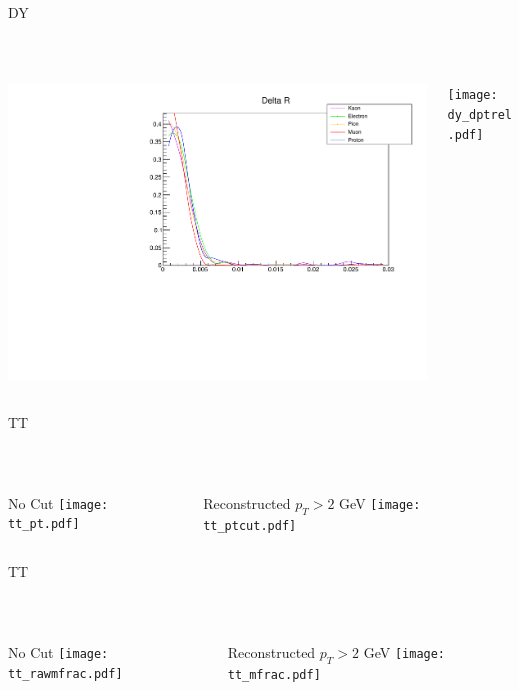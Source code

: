 \documentclass[10pt,handout]{beamer}
\begin{document}
\begin{frame}{ DY } 

\quad \quad \\
\begin{columns}
\begin{column}{0.5\textwidth}

\includegraphics[scale=.3]{dy_dr.pdf}

\end{column}
\begin{column}{0.5\textwidth}

\texttt{[image: dy\_dptrel.pdf]}
\end{column}
\end{columns}
\end{frame}

\begin{frame}{ TT } 

\quad \quad \\
\begin{columns}
\begin{column}{0.5\textwidth}
No Cut
\texttt{[image: tt\_pt.pdf]}

\end{column}
\begin{column}{0.5\textwidth}
Reconstructed $p_T > 2 $ GeV
\texttt{[image: tt\_ptcut.pdf]}
\end{column}
\end{columns}
\end{frame}

\begin{frame}{ TT } 

\quad \quad \\
\begin{columns}
\begin{column}{0.5\textwidth}
No Cut
\texttt{[image: tt\_rawmfrac.pdf]}

\end{column}
\begin{column}{0.5\textwidth}
Reconstructed $p_T > 2 $ GeV
\texttt{[image: tt\_mfrac.pdf]}
\end{column}
\end{columns}


\end{frame}
\end{document}

